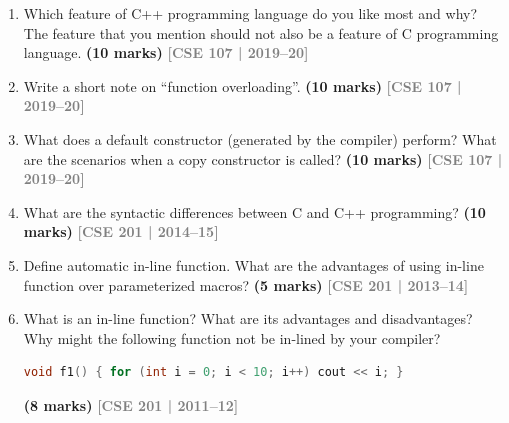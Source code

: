\documentclass[12pt,a3paper]{article}
\newcommand{\yr}[1]{\hfill\textcolor{gray}{\small\textbf{[#1]}}}
\newcommand{\mk}[1]{\textcolor{orange!70!black}{\small\textbf{(#1 marks)}}}
\begin{document}
\begin{enumerate}



\item Which feature of C++ programming language do you like most and why? The feature that you mention should not also be a feature of C programming language. \mk{10}
\yr{CSE 107 | 2019--20}




\item Write a short note on ``function overloading''. \mk{10}
\yr{CSE 107 | 2019--20}




\item What does a default constructor (generated by the compiler) perform? What are the scenarios when a copy constructor is called? \mk{10}
\yr{CSE 107 | 2019--20}




\item What are the syntactic differences between C and C++ programming? \mk{10}
\yr{CSE 201 | 2014--15}




\item Define automatic in-line function. What are the advantages of using in-line function over parameterized macros? \mk{5}
\yr{CSE 201 | 2013--14}




\item What is an in-line function? What are its advantages and disadvantages? Why might the following function not be in-lined by your compiler?
\begin{lstlisting}[language=C++]
void f1() { for (int i = 0; i < 10; i++) cout << i; }
\end{lstlisting}
\mk{8}
\yr{CSE 201 | 2011--12}





\end{enumerate}
\end{document}
